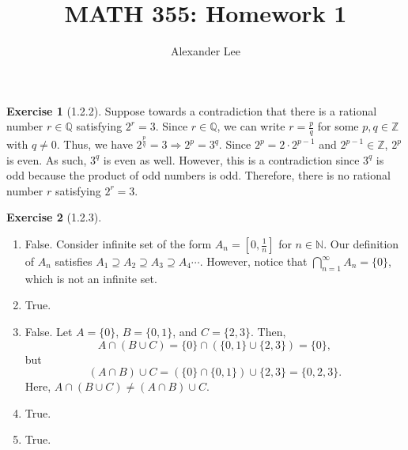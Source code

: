 \documentclass{amsart}
\title{MATH 355: Homework 1}
\author{Alexander Lee}
\theoremstyle{definition}
\newtheorem{exercise}{Exercise}
\newcommand{\N}{\mathbb{N}}
\newcommand{\Z}{\mathbb{Z}}
\newcommand{\Q}{\mathbb{Q}}
\begin{document}
\maketitle

\begin{exercise}[1.2.2]
  Suppose towards a contradiction that there is a rational number $r \in \Q$
  satisfying $2^r = 3$. Since $r \in \Q$, we can write $r = \frac{p}{q}$ for
  some $p, q \in \Z$ with $q \neq 0$. Thus, we have $2^\frac{p}{q} = 3
  \Rightarrow 2^p = 3^q$. Since $2^p = 2 \cdot 2^{p-1}$ and $2^{p-1} \in \Z$,
  $2^p$ is even. As such, $3^q$ is even as well. However, this is a
  contradiction since $3^q$ is odd because the product of odd numbers is odd.
  Therefore, there is no rational number $r$ satisfying $2^r = 3$.
\end{exercise}

\begin{exercise}[1.2.3]
  \begin{enumerate}[label={(\alph*)}]
    \item False. Consider infinite set of the form $A_n = [0, \frac{1}{n}]$ for
      $n \in \N$. Our definition of $A_n$ satisfies $A_1 \supseteq A_2 \supseteq
      A_3 \supseteq A_4 \cdots$. However, notice that $\bigcap_{n=1}^{\infty}
      A_n = \{0\}$, which is not an infinite set.
    \item True.
    \item False. Let $A = \{0\}$, $B = \{0, 1\}$, and $C = \{2, 3\}$. Then,
      \[
        A \cap (B \cup C) = \{0\} \cap (\{0, 1\} \cup \{2, 3\}) = \{0\},
      \]
      but
      \[
        (A \cap B) \cup C = (\{0\} \cap \{0, 1\}) \cup \{2, 3\} = \{0, 2, 3\}.
      \]
      Here, $A \cap (B \cup C) \neq (A \cap B) \cup C$.
    \item True.
    \item True.
  \end{enumerate}
\end{exercise}
\end{document}
